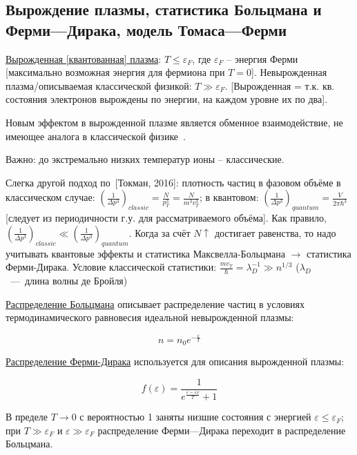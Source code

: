 \documentclass[10pt, a4paper]{article}
\numberwithin{equation}{section}
\newcommand{\Tokman}{~[Токман, 2016]}
\begin{document}
\subsection{Вырождение плазмы, статистика Больцмана и Ферми—Дирака, модель Томаса—Ферми}

\uline{Вырожденная [квантованная] плазма}: $T \leq \varepsilon_F$, где $\varepsilon_F$ -- энергия Ферми [максимально возможная энергия для фермиона при $T=0$]. Невырожденная плазма/описываемая классической физикой: $T \gg \varepsilon_F$. [Вырожденная = т.к. кв. состояния электронов вырождены по энергии, на каждом уровне их по два].

Новым эффектом в вырожденной плазме является обменное взаимодействие, не имеющее аналога в классической физике~\cite{kotelnikov}.

Важно: до экстремально низких температур ионы -- классические.

Слегка другой подход по\Tokman: плотность частиц в фазовом объёме в классическом случае: $\left( \frac{1}{\Delta p^3}\right)_{classic} = \frac{N}{p_T^3} = \frac{N}{m^3v_T^3}$; в квантовом: $\left(\frac{1}{\Delta p^3}\right)_{quantum} = \frac{V}{2 \pi \hbar^3}$ [следует из периодичности г.у. для рассматриваемого объёма]. Как правило, $\left( \frac{1}{\Delta p^3}\right)_{classic} \ll \left(\frac{1}{\Delta p^3}\right)_{quantum}$. Когда за счёт $N\uparrow$ достигает равенства, то надо учитывать квантовые эффекты и статистика Максвелла-Больцмана $\rightarrow$ статистика Ферми-Дирака. Условие классической статистики: $\frac{mv_T}{\hbar} = \lambda_D^{-1} \gg n^{1/3}$ ($\lambda_D$~---~длина волны де Бройля)

\uline{Распределение Больцмана} описывает распределение частиц в условиях термодинамического равновесия идеальной невырожденной плазмы:

\begin{equation}
	n = n_0e^{-\frac{\varepsilon}{T}}
\end{equation}

\uline{Распределение Ферми-Дирака} используется для описания вырожденной плазмы:

\begin{equation}
	f(\varepsilon) = \frac{1}{e^{\frac{\varepsilon-\varepsilon_F}{T}}+1}
\end{equation}

В пределе $T\rightarrow 0$ с вероятностью 1 заняты низшие состояния с энергией $\varepsilon \leq \varepsilon_F$; при $T \gg \varepsilon_F$ и $\varepsilon \gg \varepsilon_F$ распределение Ферми—Дирака переходит в распределение Больцмана.
\end{document}
